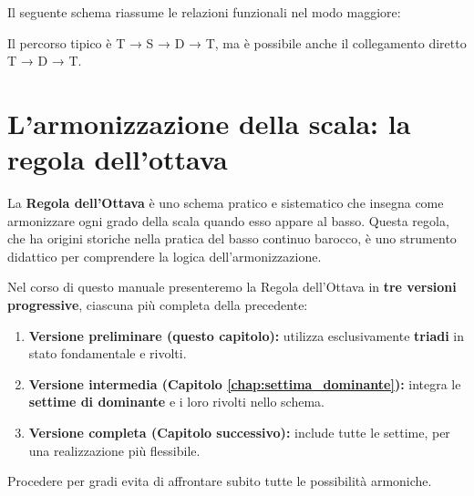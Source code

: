 	Il seguente schema riassume le relazioni funzionali nel modo maggiore:
	
	\begin{center}
	\end{center}
	
	Il percorso tipico è T → S → D → T, ma è possibile anche il collegamento diretto T → D → T.


\section{L'armonizzazione della scala: la regola dell'ottava}
\label{sec:regola_ottava_funzioni}

La \textbf{Regola dell'Ottava} è uno schema pratico e sistematico che insegna come armonizzare ogni grado della scala quando esso appare al basso. Questa regola, che ha origini storiche nella pratica del basso continuo barocco, è uno strumento didattico per comprendere la logica dell'armonizzazione.

\begin{definizione}
	\label{def:versioni_regola_ottava}
	Nel corso di questo manuale presenteremo la Regola dell'Ottava in \textbf{tre versioni progressive}, ciascuna più completa della precedente:
	
	\begin{enumerate}
		\item \textbf{Versione preliminare (questo capitolo):} utilizza esclusivamente \textbf{triadi} in stato fondamentale e rivolti.
		\item \textbf{Versione intermedia (Capitolo \ref{chap:settima_dominante}):} integra le \textbf{settime di dominante} e i loro rivolti nello schema.
		\item \textbf{Versione completa (Capitolo successivo):} include tutte le settime, per una realizzazione più flessibile.
	\end{enumerate}
	
	Procedere per gradi evita di affrontare subito tutte le possibilità armoniche.
\end{definizione}

